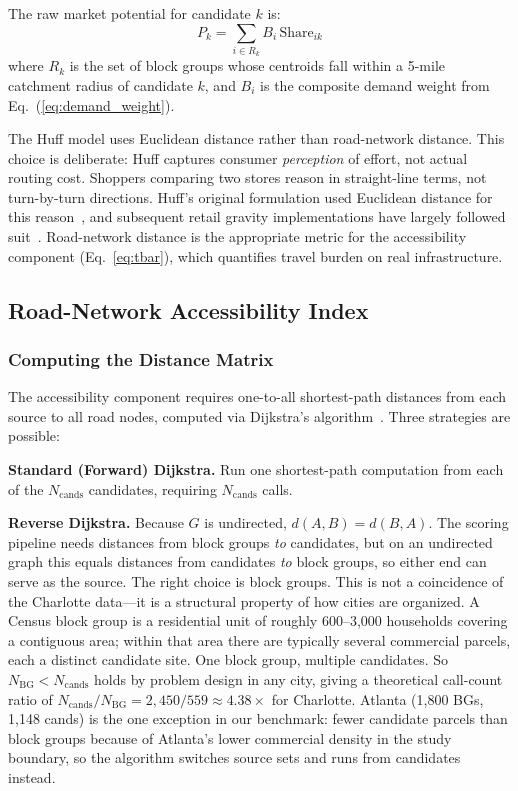\documentclass[conference]{IEEEtran}
\begin{document}
The raw market potential for candidate $k$ is:
\begin{equation}
P_k = \sum_{i \in R_k} B_i\,\text{Share}_{ik}
\label{eq:potential}
\end{equation}
where $R_k$ is the set of block groups whose centroids fall within a
5-mile catchment radius of candidate $k$, and $B_i$ is the composite
demand weight from Eq.~(\ref{eq:demand_weight}).

The Huff model uses Euclidean distance rather than road-network
distance. This choice is deliberate: Huff captures consumer
\textit{perception} of effort, not actual routing cost. Shoppers
comparing two stores reason in straight-line terms, not turn-by-turn
directions. Huff's original formulation used Euclidean distance for
this reason~\cite{Huff1964}, and subsequent retail gravity
implementations have largely followed suit~\cite{Nakanishi1974,
Liang2020,Drezner2002}. Road-network distance is the appropriate metric for the
accessibility component (Eq.~\ref{eq:tbar}), which quantifies travel
burden on real infrastructure.

\subsection{Road-Network Accessibility Index}
\label{sec:sssp}

\subsubsection{Computing the Distance Matrix}

The accessibility component requires one-to-all shortest-path
distances from each source to all road nodes, computed via
Dijkstra's algorithm~\cite{Dijkstra1959}. Three strategies are
possible:

\textbf{Standard (Forward) Dijkstra.} Run one shortest-path
computation from each of the $N_{\text{cands}}$ candidates,
requiring $N_{\text{cands}}$ calls.

\textbf{Reverse Dijkstra.} Because $G$ is undirected,
$d(A,B) = d(B,A)$. The scoring pipeline needs distances from
block groups \emph{to} candidates, but on an undirected graph this
equals distances from candidates \emph{to} block groups, so either
end can serve as the source. The right choice is block groups.
This is not a coincidence of the Charlotte data---it is a structural
property of how cities are organized. A Census block group is a
residential unit of roughly 600--3{,}000 households covering a
contiguous area; within that area there are typically several
commercial parcels, each a distinct candidate site. One block group,
multiple candidates. So $N_{\text{BG}} < N_{\text{cands}}$ holds
by problem design in any city, giving a theoretical call-count ratio
of $N_{\text{cands}}/N_{\text{BG}} = 2{,}450/559 \approx 4.38\times$
for Charlotte. Atlanta (1{,}800 BGs, 1{,}148 cands) is the one
exception in our benchmark: fewer candidate parcels than block groups
because of Atlanta's lower commercial density in the study boundary,
so the algorithm switches source sets and runs from candidates instead.
\end{document}
